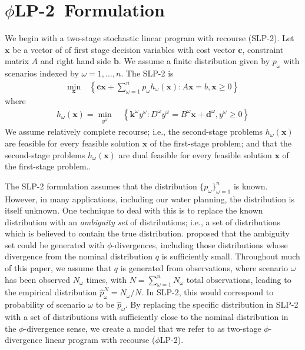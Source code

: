 \documentclass[ijoc,nonblindrev]{informs3} %
\newcommand{\x}{\mathbf{x}}
\renewcommand{\c}{\mathbf{c}}
\renewcommand{\k}{\mathbf{k}}
\renewcommand{\b}{\mathbf{b}}
\renewcommand{\d}{\mathbf{d}}
\newcommand{\st}{\mbox{s.t.}}
\newcommand{\plp}{$\phi$LP-2}
\begin{document}
\section{\plp\ Formulation}
\label{sec:plp2}

We begin with a two-stage stochastic linear program with recourse (SLP-2).
Let $\x$ be a vector of of first stage decision variables with cost vector $\c$, constraint matrix $A$ and right hand side $\b$.
We assume a finite distribution given by $p_\omega$ with scenarios indexed by $\omega = 1, \dots, n$.
The SLP-2 is
\begin{align}
	\min_\x \ & \left\{ \c\x + \sum_{\omega=1}^n p_\omega h_\omega(\x) : A\x = b, \x \geq 0 \right\} \label{eq:slp_first_stage}%
\end{align}
where
\begin{align}
	h_\omega(\x) = \min_{y^\omega} \ & \left\{ \k^\omega y^\omega : D^\omega y^\omega = B^\omega \x + \d^\omega, y^\omega \geq 0 \right\} \label{eq:slp_second_stage}%
\end{align}
We assume relatively complete recourse; i.e., the second-stage problems $h_\omega(\x)$ are feasible for every feasible solution $\x$ of the first-stage problem; and that the second-stage problems $h_\omega(\x)$ are dual feasible for every feasible solution $\x$ of the first-stage problem..

The SLP-2 formulation assumes that the distribution $\{p_\omega\}_{\omega=1}^n$ is known.
However, in many applications, including our water planning, the distribution is itself unknown.
One technique to deal with this is to replace the known distribution with an {\it ambiguity set} of distributions; i.e., a set of distributions which is believed to contain the true distribution.
\cite{bental2011robust} proposed that the ambiguity set could be generated with $\phi$-divergences, including those distributions whose divergence from the nominal distribution $q$ is sufficiently small.
Throughout much of this paper, we assume that $q$ is generated from observations, where scenario $\omega$ has been observed $N_\omega$ times, with $N = \sum_{\omega=1}^n N_\omega$ total observations, leading to the empirical distribution $\hat{p}^N_\omega = N_\omega / N$.
In SLP-2, this would correspond to probability of scenario $\omega$ to be $\hat{p}_\omega$.
By replacing the specific distribution in SLP-2 with a set of distributions with sufficiently close to the nominal distribution in the $\phi$-divergence sense, we create a model that we refer to as two-stage $\phi$-divergence linear program with recourse (\plp).
\end{document}
